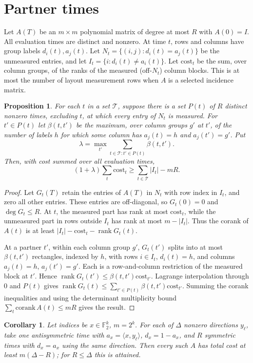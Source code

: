 \documentclass[11pt]{article}
\newtheorem{proposition}[theorem]{Proposition}
\newtheorem{corollary}[theorem]{Corollary}
\newcommand{\rank}{\operatorname{rank}}
\begin{document}
\section{Partner times}
Let $A(T)$ be an $m\times m$ polynomial matrix of degree at most $R$ with $A(0)=I$. All evaluation times are distinct and nonzero. At time $t$, rows and columns have group labels $d_i(t),a_j(t)$. Let $N_t=\{(i,j):d_i(t)=a_j(t)\}$ be the unmeasured entries, and let $I_t=\{i:d_i(t)\ne a_i(t)\}$. Let $\mathrm{cost}_t$ be the sum, over column groups, of the ranks of the measured (off-$N_t$) column blocks. This is at most the number of layout measurement rows when $A$ is a selected incidence matrix.
\begin{proposition}\label{prop:partner}
For each $t$ in a set $\mathcal T$, suppose there is a set $P(t)$ of $R$ distinct nonzero times, excluding $t$, at which every entry of $N_t$ is measured. For $t'\in P(t)$ let $\beta(t,t')$ be the maximum, over column groups $g'$ at $t'$, of the number of labels $h$ for which some column has $a_j(t)=h$ and $a_j(t')=g'$. Put
\[\lambda=\max_{t'}\sum_{t\in\mathcal T:t'\in P(t)}\beta(t,t').\]
Then, with cost summed over all evaluation times,
\[(1+\lambda)\sum_t\mathrm{cost}_t\ge\sum_{t\in\mathcal T}|I_t|-mR.\]
\end{proposition}
\begin{proof}
Let $G_t(T)$ retain the entries of $A(T)$ in $N_t$ with row index in $I_t$, and zero all other entries. These entries are off-diagonal, so $G_t(0)=0$ and $\deg G_t\le R$. At $t$, the measured part has rank at most $\mathrm{cost}_t$, while the unmeasured part in rows outside $I_t$ has rank at most $m-|I_t|$. Thus the corank of $A(t)$ is at least $|I_t|-\mathrm{cost}_t-\rank G_t(t)$.

At a partner $t'$, within each column group $g'$, $G_t(t')$ splits into at most $\beta(t,t')$ rectangles, indexed by $h$, with rows $i\in I_t$, $d_i(t)=h$, and columns $a_j(t)=h$, $a_j(t')=g'$. Each is a row-and-column restriction of the measured block at $t'$. Hence $\rank G_t(t')\le\beta(t,t')\mathrm{cost}_{t'}$. Lagrange interpolation through $0$ and $P(t)$ gives $\rank G_t(t)\le\sum_{t'\in P(t)}\beta(t,t')\mathrm{cost}_{t'}$. Summing the corank inequalities and using the determinant multiplicity bound $\sum_t\mathrm{corank}\,A(t)\le mR$ gives the result.
\end{proof}
\begin{corollary}\label{cor:coset}
Let indices be $x\in\mathbb F_2^k$, $m=2^k$. For each of $\Delta$ nonzero directions $y_\ell$, take one antisymmetric time with $a_x=\langle x,y_\ell\rangle$, $d_x=1-a_x$, and $R$ symmetric times with $d_x=a_x$ using the same direction. Then every such $A$ has total cost at least $m(\Delta-R)$; for $R\le\Delta$ this is attained.
\end{corollary}
\end{document}
